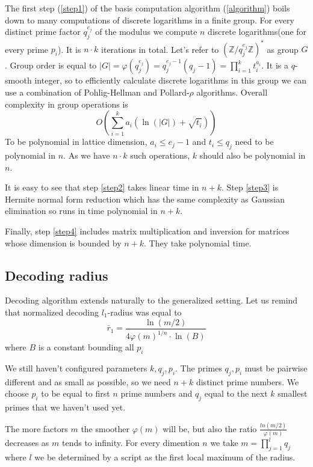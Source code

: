 \documentclass[12pt]{article}
\newcommand{\ZZ}{\mathbb{Z}}
\begin{document}
The first step (\ref{step1}) of the basis computation algorithm (\ref{algorithm}) boils down to many computations of discrete logarithms in a finite group. For every distinct prime factor $q_{j}^{e_{j}}$ of the modulus we compute $n$ discrete logarithms(one for every prime $p_{i}$). It is $n \cdot k$ iterations in total. Let's refer to $(\ZZ/q_{j}^{e_{j}}\ZZ)^*$ as group $G$. Group order is equal to $|G| = \varphi(q_{j}^{e_{j}}) =  q_{j}^{e_{j}-1}(q_{j}-1) = \prod_{i=1}^{k} t_{i}^{a_{i}}$.
It is a $q$-smooth integer, so to efficiently calculate discrete logarithms in this group we can use a combination of Pohlig-Hellman \cite{[PH78]} and Pollard-$\rho$ \cite{[Pol78]} algorithms. Overall complexity in group operations is
\[
    O(\sum_{i=1}^{k} a_{i}(\ln(|G|) + \sqrt{t_{i}}))
\]
To be polynomial in lattice dimension, $a_{i} \leq e_{j}-1$ and $t_{i} \leq q_{j}$ need to be polynomial in $n$. As we have $n \cdot k$ such operations, $k$ should also be polynomial in $n$.

It is easy to see that step \ref{step2} takes linear time in $n + k$. Step \ref{step3} is Hermite normal form reduction which has the same complexity as Gaussian elimination so runs in time polynomial in $n + k$.

Finally, step \ref{step4} includes matrix multiplication and inversion for matrices whose dimension is bounded by $n + k$. They take polynomial time.


\subsection{Decoding radius}
\label{subsec:radius_integers}


Decoding algorithm extends naturally to the generalized setting. Let us remind that normalized decoding $l_{1}$-radius was equal to
\[
    \bar r_{1} = \frac{\ln(m/2)}{4 \varphi(m)^{1/n} \cdot \ln(B)}
\]
where $B$ is a constant bounding all $p_{i}$

We still haven't configured parameters $k, q_{j}, p_{i}$. The primes $q_{j}, p_{i}$ must be pairwise different and as small as possible, so we need $n+k$ distinct prime numbers. We choose $p_{i}$ to be equal to first $n$ prime numbers and $q_{j}$ equal to the next $k$ smallest primes that we haven't used yet.

The more factors $m$ the smoother $\varphi(m)$ will be, but also the ratio $\frac{ln(m/2)}{\varphi(m)}$ decreases as $m$ tends to infinity. For every dimention $n$ we take $m = \prod_{j = 1}^{l} q_j$ where $l$ we be determined by a script as the first local maximum of the radius.
\end{document}
